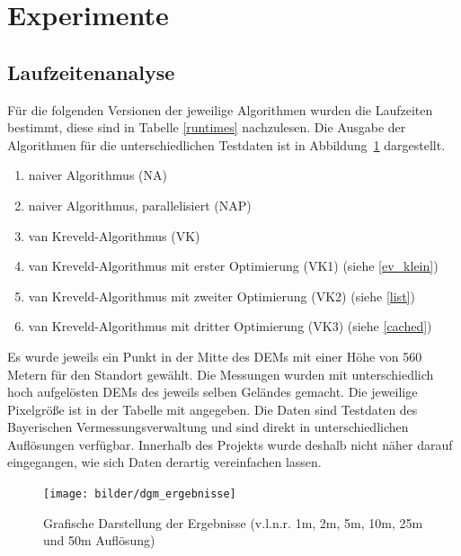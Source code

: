 \section{Experimente}
\label{exp}

\subsection{Laufzeitenanalyse}
\label{laufzeit}

Für die folgenden Versionen der jeweilige Algorithmen wurden die Laufzeiten bestimmt, diese sind in Tabelle \ref{runtimes} nachzulesen. 
Die Ausgabe der Algorithmen für die unterschiedlichen Testdaten ist in Abbildung~\ref{dgm_erg} dargestellt. 

\begin{enumerate}
 \item naiver Algorithmus (NA)
 \item naiver Algorithmus, parallelisiert (NAP)
 \item van Kreveld-Algorithmus (VK)
 \item van Kreveld-Algorithmus mit erster Optimierung (VK1) (siehe \ref{ev_klein})
 \item van Kreveld-Algorithmus mit zweiter Optimierung (VK2) (siehe \ref{list})
 \item van Kreveld-Algorithmus mit dritter Optimierung (VK3) (siehe \ref{cached})
\end{enumerate}

Es wurde jeweils ein Punkt in der Mitte des DEMs mit einer Höhe von 560 Metern für den Standort gewählt. 
Die Messungen wurden mit unterschiedlich hoch aufgelösten DEMs des jeweils selben Geländes gemacht. Die jeweilige Pixelgröße ist in der Tabelle mit angegeben. 
Die Daten sind Testdaten des Bayerischen Vermessungsverwaltung \cite{berchtesgaden} und sind direkt in unterschiedlichen Auflösungen verfügbar. 
Innerhalb des Projekts wurde deshalb nicht näher darauf eingegangen, wie sich Daten derartig vereinfachen lassen. 

\begin{figure}[!ht]
 \centering
 \texttt{[image: bilder/dgm\_ergebnisse]}
 \caption{Grafische Darstellung der Ergebnisse \newline(v.l.n.r. 1m, 2m, 5m, 10m, 25m und 50m Auflösung)}
 \label{dgm_erg}
\end{figure}

